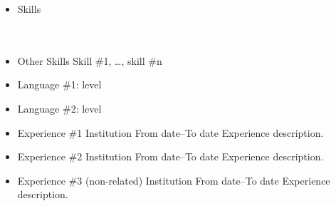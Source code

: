 \documentclass[11pt,a4paper]{article}
\begin{document}
\begin{minipage}[t][20cm]{7cm}%
    \vspace*{0.1cm}%
    \begin{itemize}[%
        leftmargin=*,%
        rightmargin=1cm,%
        label=\textcolor{\defaultcolor}{\textbullet}%
        ]%
        \item \technology%
            {Skills}%
            {
                {}\\%
                {}\\%
                {}\\%
                {}%
            }
        \item \technology%
            {Other Skills}%
            {Skill \#1, \ldots, skill \#n}%
    \end{itemize}%
    \vspace*{0.3cm}%
    \vspace*{0.1cm}%
    \begin{itemize}[label=\textcolor{\defaultcolor}{\textbullet},noitemsep]%
        \item Language \#1: level%
        \item Language \#2: level%
    \end{itemize}%
    \vspace*{0.3cm}%
    \vspace*{0.1cm}%
    \begin{itemize}[%
        leftmargin=*,%
        rightmargin=1cm,%
        label=\textcolor{\defaultcolor}{\textbullet}%
        ]%
        \item[\linkedlist{a}]\otherexperienceentry%
            {Experience \#1}%
            {Institution}%
            {From date--To date}%
            {Experience description.}%
        \item[\linkedlist{b}]\otherexperienceentry%
            {Experience \#2}%
            {Institution}%
            {From date--To date}%
            {Experience description.}%
        \item\otherexperienceentry%
            {Experience \#3 (non-related)}%
            {Institution}%
            {From date--To date}%
            {Experience description.}%
    \end{itemize}%
\end{minipage}%
\end{document}
